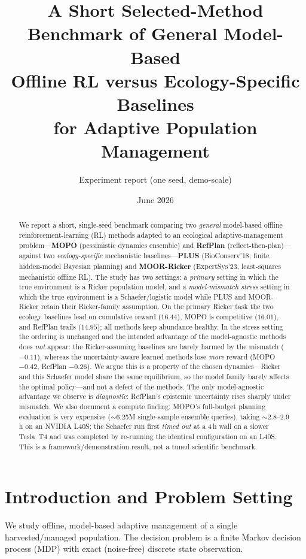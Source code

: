 \documentclass[11pt]{article}
\title{\textbf{A Short Selected-Method Benchmark of General Model-Based\\
Offline RL versus Ecology-Specific Baselines\\
for Adaptive Population Management}}
\author{Experiment report (one seed, demo-scale)}
\date{June 2026}
\begin{document}
\maketitle

\begin{abstract}
We report a short, single-seed benchmark comparing two \emph{general} model-based
offline reinforcement-learning (RL) methods adapted to an ecological
adaptive-management problem---\textbf{MOPO} (pessimistic dynamics ensemble) and
\textbf{RefPlan} (reflect-then-plan)---against two \emph{ecology-specific}
mechanistic baselines---\textbf{PLUS} (BioConserv'18, finite hidden-model Bayesian
planning) and \textbf{MOOR-Ricker} (ExpertSys'23, least-squares mechanistic
offline RL). The study has two settings: a \emph{primary} setting in which the
true environment is a Ricker population model, and a \emph{model-mismatch stress}
setting in which the true environment is a Schaefer/logistic model while PLUS and
MOOR-Ricker retain their Ricker-family assumption. On the primary Ricker task the
two ecology baselines lead on cumulative reward
($16.44$), MOPO is competitive ($16.01$), and RefPlan trails ($14.95$); all
methods keep abundance healthy. In the stress setting the ordering is unchanged
and the intended advantage of the model-agnostic methods does \emph{not} appear:
the Ricker-assuming baselines are barely harmed by the mismatch ($-0.11$), whereas
the uncertainty-aware learned methods lose \emph{more} reward (MOPO $-0.42$,
RefPlan $-0.26$). We argue
this is a property of the chosen dynamics---Ricker and this Schaefer model share
the same equilibrium, so the model family barely affects the optimal policy---and
not a defect of the methods. The only model-agnostic advantage we observe is
\emph{diagnostic}: RefPlan's epistemic uncertainty rises sharply under mismatch.
We also document a compute finding: MOPO's full-budget planning evaluation is
very expensive ($\sim$6.25M single-sample ensemble queries), taking $\sim$2.8--2.9\,h
on an NVIDIA L40S; the Schaefer run first \emph{timed out} at a 4\,h wall on a
slower Tesla~T4 and was completed by re-running the identical configuration on an
L40S. This is a framework/demonstration result, not a tuned scientific benchmark.
\end{abstract}

\section{Introduction and Problem Setting}

We study offline, model-based adaptive management of a single harvested/managed
population. The decision problem is a finite Markov decision process (MDP) with
exact (noise-free) discrete state observation.
\end{document}
